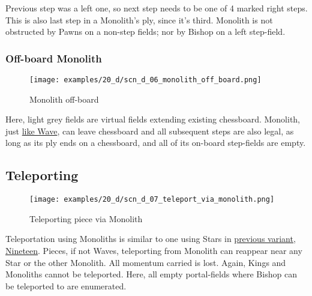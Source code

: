 Previous step was a left one, so next step needs to be one of 4 marked right
steps. This is also last step in a Monolith's ply, since it's third. Monolith
is not obstructed by Pawns on a non-step fields; nor by Bishop on a left
step-field.

\clearpage %

\subsubsection*{Off-board Monolith}

\vspace*{-1.2\baselineskip}
\noindent
\begin{figure}[!h]
\texttt{[image: examples/20\_d/scn\_d\_06\_monolith\_off\_board.png]}
\caption{Monolith off-board}
\label{fig:scn_d_06_monolith_off_board}
\end{figure}

Here, light grey fields are virtual fields extending existing chessboard.
Monolith, just \hyperref[fig:scn_hd_10_wave_activated_by_centaur_off_board]{like Wave},
can leave chessboard and all subsequent steps are also legal, as long as its ply ends
on a chessboard, and all of its on-board step-fields are empty.

\clearpage %

\subsection*{Teleporting}

\vspace*{-0.9\baselineskip}
\noindent
\begin{figure}[!h]
\texttt{[image: examples/20\_d/scn\_d\_07\_teleport\_via\_monolith.png]}
\caption{Teleporting piece via Monolith}
\label{fig:scn_d_07_teleport_via_monolith}
\end{figure}

Teleportation using Monoliths is similar to one using Stars in \hyperref[fig:scn_n_02_teleport_init]{previous variant, Nineteen}.
Pieces, if not Waves, teleporting from Monolith can reappear near any Star or the other Monolith.
All momentum carried is lost. Again, Kings and Monoliths cannot be teleported.
Here, all empty portal-fields where Bishop can be teleported to are enumerated.

